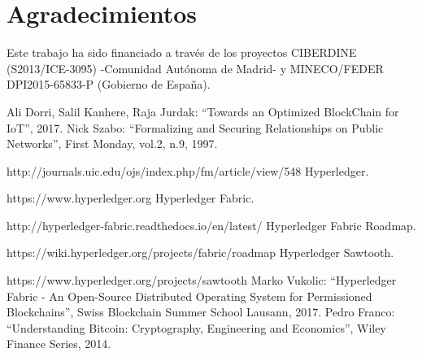 \documentclass[10pt,conference,a4paper]{IEEEtran}
\begin{document}
\section*{Agradecimientos}

Este trabajo ha sido financiado a través de los proyectos
CIBERDINE (S2013/ICE-3095) -Comunidad Autónoma de Madrid- y
MINECO/FEDER DPI2015-65833-P (Gobierno de España).



\begin{thebibliography}{99}
Ali Dorri, Salil Kanhere, Raja Jurdak: ``Towards an Optimized BlockChain for IoT'', 2017.
Nick Szabo: ``Formalizing and Securing Relationships on Public Networks'', First Monday, vol.2, n.9, 1997.

http://journals.uic.edu/ojs/index.php/fm/article/view/548
Hyperledger.

https://www.hyperledger.org
Hyperledger Fabric.

http://hyperledger-fabric.readthedocs.io/en/latest/
Hyperledger Fabric Roadmap.

https://wiki.hyperledger.org/projects/fabric/roadmap
Hyperledger Sawtooth.

https://www.hyperledger.org/projects/sawtooth
Marko Vukolic: ``Hyperledger Fabric - An Open-Source Distributed Operating System for Permissioned Blockchains'', Swiss Blockchain Summer School Lausann, 2017.
Pedro Franco: ``Understanding Bitcoin: Cryptography, Engineering and Economics'', Wiley Finance Series, 2014.

\end{thebibliography}
\end{document}
